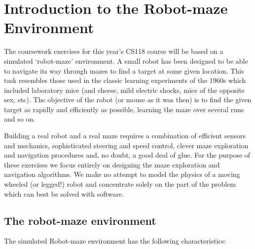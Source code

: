 \clearpage
\section{Introduction to the Robot-maze Environment}

The coursework exercises for this year's CS118 course will be based on 
a simulated `robot-maze' environment.  A small robot has been designed to
be able to navigate its way through mazes to find a target at some given
location.  This task resembles those used in the classic learning 
experiments of the 1960s which included laboratory
mice (and cheese, mild electric shocks, mice of the opposite sex, etc).
The objective of the robot (or mouse as it was then) is to 
find the given target as rapidly and efficiently as
possible, learning the maze over several runs and so on.  

Building a real robot and a real maze requires a combination of efficient 
sensors and mechanics, sophisticated steering and speed control, clever 
maze exploration and navigation procedures and, no doubt, a good deal of
glue.  For the purpose of these exercises we focus
entirely on designing the maze exploration and navigation algorithms.
We make no attempt to model the physics of a moving wheeled (or legged!)
robot and concentrate solely on the part of the 
problem which can best be solved with software. 

\subsection{The robot-maze environment}

The simulated Robot-maze environment has the following characteristics:

